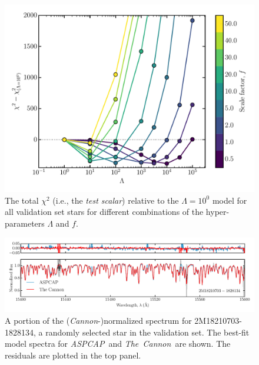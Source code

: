 \documentclass[12pt,preprint]{aastex6}
\newcommand{\project}[1]{\textsl{#1}}
\newcommand{\TheCannon}{\project{The~Cannon}}
\newcommand{\acronym}[1]{{\small{#1}}}
\newcommand{\aspcap}{\project{\acronym{ASPCAP}}}
\begin{document}
\begin{figure}[p]
\centering
\includegraphics[width=\textwidth]{validation-scalar.pdf}
\caption{The total $\chi^2$ (i.e., the \emph{test scalar}) relative to the $\Lambda = 10^0$ model for all validation set stars for different combinations of the hyper-parameters $\Lambda$ and $f$.
 \label{fig:gridsearch-test-scalar}}
\end{figure}

\clearpage

\begin{figure}[p]
\centering
\includegraphics[width=\textwidth]{spectrum.pdf}
\caption{A portion of the (\emph{Cannon}-)normalized spectrum for 2M18210703-1828134,
a randomly selected star in the validation set.  The best-fit model spectra
for \aspcap\ and \TheCannon\ are shown. The residuals are plotted in the top panel.\label{fig:correctness}}
\end{figure}

\clearpage
\end{document}
